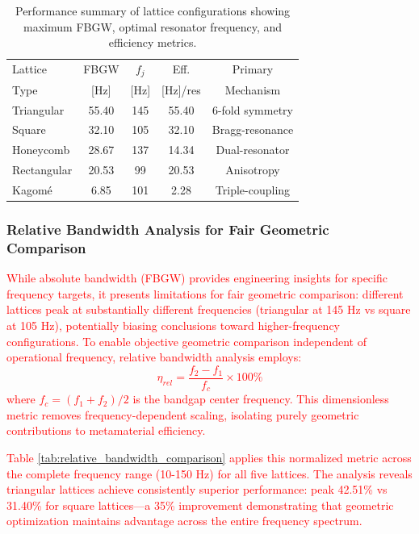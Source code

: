 \documentclass[review,numbers,sort&compress]{elsarticle}
\begin{document}
{\begin{table}[htb]
\small
\centering
\caption{Performance summary of lattice configurations showing maximum FBGW, optimal resonator frequency, and efficiency metrics.}
\label{tab:performance_summary}
\begin{tabular}{lcccc}
\hline
Lattice & FBGW & $f_j$ & Eff. & Primary \\
Type & [Hz] & [Hz] & [Hz]/res & Mechanism \\
\hline
Triangular & 55.40 & 145 & 55.40 & 6-fold symmetry \\
Square & 32.10 & 105 & 32.10 & Bragg-resonance \\
Honeycomb & 28.67 & 137 & 14.34 & Dual-resonator \\
Rectangular & 20.53 & 99 & 20.53 & Anisotropy \\
Kagomé & 6.85 & 101 & 2.28 & Triple-coupling \\
\hline
\end{tabular}
\end{table}

\subsubsection*{Relative Bandwidth Analysis for Fair Geometric Comparison}

\textcolor{red}{While absolute bandwidth (FBGW) provides engineering insights for specific frequency targets, it presents limitations for fair geometric comparison: different lattices peak at substantially different frequencies (triangular at 145 Hz vs square at 105 Hz), potentially biasing conclusions toward higher-frequency configurations. To enable objective geometric comparison independent of operational frequency, relative bandwidth analysis employs:
\begin{equation}
\eta_{rel} = \frac{f_2 - f_1}{f_c} \times 100\%
\label{eq:relative_bandwidth}
\end{equation}
where $f_c = (f_1 + f_2)/2$ is the bandgap center frequency. This dimensionless metric removes frequency-dependent scaling, isolating purely geometric contributions to metamaterial efficiency.}

\textcolor{red}{Table \ref{tab:relative_bandwidth_comparison} applies this normalized metric across the complete frequency range (10-150 Hz) for all five lattices. The analysis reveals triangular lattices achieve consistently superior performance: peak 42.51\% vs 31.40\% for square lattices—a 35\% improvement demonstrating that geometric optimization maintains advantage across the entire frequency spectrum.}

}
\end{document}
